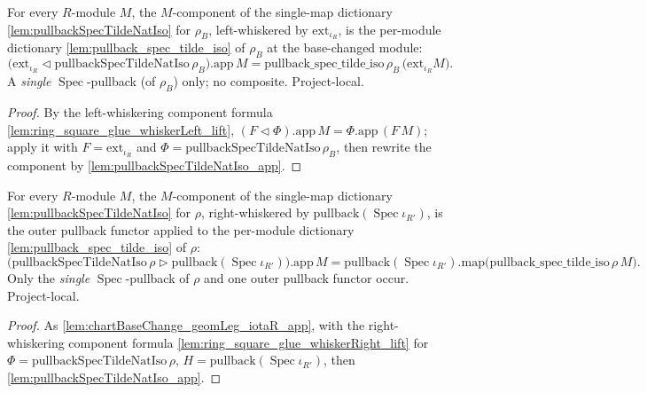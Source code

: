 \begin{lemma}
  \label{lem:chartBaseChange_geomLeg_rhoB_app}
  For every \(R\)-module \(M\), the \(M\)-component of the single-map dictionary
  \cref{lem:pullbackSpecTildeNatIso} for \(\rho_B\), left-whiskered by \(\mathrm{ext}_{\iota_R}\), is the
  per-module dictionary \cref{lem:pullback_spec_tilde_iso} of \(\rho_B\) at the base-changed module:
  \[
    \bigl(\mathrm{ext}_{\iota_R} \lhd \mathrm{pullbackSpecTildeNatIso}\,\rho_B\bigr).\mathrm{app}\,M
      = \mathrm{pullback\_spec\_tilde\_iso}\,\rho_B\,\bigl(\mathrm{ext}_{\iota_R} M\bigr).
  \]
  A \emph{single} \(\operatorname{Spec}\)-pullback (of \(\rho_B\)) only; no composite. Project-local.
  \begin{proof}
    By the left-whiskering component formula \cref{lem:ring_square_glue_whiskerLeft_lift},
    \((F \lhd \Phi).\mathrm{app}\,M = \Phi.\mathrm{app}\,(F\,M)\); apply it with
    \(F = \mathrm{ext}_{\iota_R}\) and \(\Phi = \mathrm{pullbackSpecTildeNatIso}\,\rho_B\), then rewrite
    the component by \cref{lem:pullbackSpecTildeNatIso_app}.
  \end{proof}
\end{lemma}

\begin{lemma}
  \label{lem:chartBaseChange_geomLeg_rho_app}
  For every \(R\)-module \(M\), the \(M\)-component of the single-map dictionary
  \cref{lem:pullbackSpecTildeNatIso} for \(\rho\), right-whiskered by
  \(\mathrm{pullback}(\operatorname{Spec}\iota_{R'})\), is the outer pullback functor applied to the
  per-module dictionary \cref{lem:pullback_spec_tilde_iso} of \(\rho\):
  \[
    \bigl(\mathrm{pullbackSpecTildeNatIso}\,\rho \rhd
      \mathrm{pullback}(\operatorname{Spec}\iota_{R'})\bigr).\mathrm{app}\,M
      = \mathrm{pullback}(\operatorname{Spec}\iota_{R'}).\mathrm{map}
        \bigl(\mathrm{pullback\_spec\_tilde\_iso}\,\rho\,M\bigr).
  \]
  Only the \emph{single} \(\operatorname{Spec}\)-pullback of \(\rho\) and one outer pullback functor
  occur. Project-local.
  \begin{proof}
    As \cref{lem:chartBaseChange_geomLeg_iotaR_app}, with the right-whiskering component formula
    \cref{lem:ring_square_glue_whiskerRight_lift} for
    \(\Phi = \mathrm{pullbackSpecTildeNatIso}\,\rho\),
    \(H = \mathrm{pullback}(\operatorname{Spec}\iota_{R'})\), then
    \cref{lem:pullbackSpecTildeNatIso_app}.
  \end{proof}
\end{lemma}

